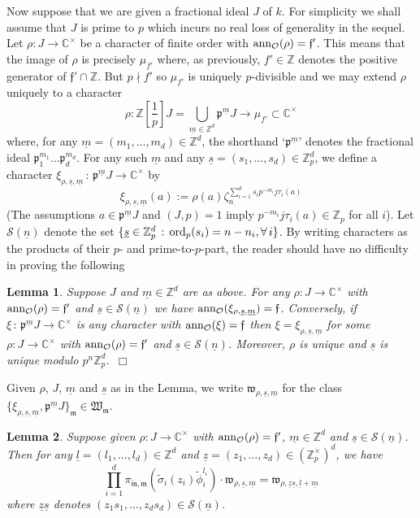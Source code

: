 \documentclass[12pt]{article}
\newtheorem{lemma}{Lemma}[section]
\newcounter{rem}[section]%
\newcommand{\bbC}{\ensuremath{\mathbb{C}}}
\newcommand{\bbZ}{\ensuremath{\mathbb{Z}}}
\newcommand{\beql}[1]{\begin{equation}\label{#1}}
\newcommand{\cO}{\ensuremath{\mathcal{O}}}
\newcommand{\cS}{\ensuremath{\mathcal{S}}}
\newcommand{\eeq}{\end{equation}}
\newcommand{\ePf}{\hspace*{\fill}~$\Box$\vertsp\par}%
\newcommand{\ff}{\ensuremath{\mathfrak{f}}}
\newcommand{\fm}{\ensuremath{\mathfrak{m}}}
\newcommand{\fp}{\ensuremath{\mathfrak{p}}}
\newcommand{\fw}{\ensuremath{\mathfrak{w}}}
\newcommand{\fW}{\ensuremath{\mathfrak{W}}}
\newcommand{\ndiv}{\nmid}
\newcommand{\ord}{{\rm ord}}
\newcommand{\rem}{\refstepcounter{rem}\noindent{\sc Remark \therem}}%
\renewcommand{\therem}{\thesection.\arabic{rem}}
\newcommand{\vertsp}{\vspace{1ex}}
\newcommand{\tfm}{\ensuremath{{\tilde{\fm}}}}
\newcommand{\tphi}{\ensuremath{\tilde{\phi}}}
\newcommand{\tsigma}{\ensuremath{\tilde{\sigma}}}
\newcommand{\ul}{\ensuremath{{\underline{l}}}}
\newcommand{\um}{\ensuremath{{\underline{m}}}}
\newcommand{\un}{\ensuremath{{\underline{n}}}}
\newcommand{\us}{\ensuremath{{\underline{s}}}}
\newcommand{\uz}{\ensuremath{{\underline{z}}}}
\begin{document}
Now suppose that we are given a fractional ideal $J$ of $k$.
For simplicity we shall assume that $J$ is prime to $p$ which incurs no real loss
of generality in the sequel. Let $\rho:J\rightarrow\bbC^\times$
be a character of finite order
with ${\rm ann}_\cO(\rho)=\ff'$. This means that the image of $\rho$ is precisely
$\mu_{f'}$ where, as previously, $f'\in\bbZ$ denotes the
positive generator of $\ff'\cap \bbZ$. But $p\ndiv f'$ so
$\mu_{f'}$ is uniquely $p$-divisible and we may extend
$\rho$ uniquely to a character
\[
\rho:\bbZ[{\textstyle\frac{1}{p}}]J=
\bigcup_{\um\in\bbZ^d}\fp^\um J\longrightarrow\mu_{f'}\subset\bbC^\times
\]
where, for any $\um=(m_1,\ldots,m_d)\in\bbZ^d$,  the shorthand `$\fp^\um$' denotes
the fractional ideal $\fp_1^{m_1}\ldots\fp_d^{m_d}$. For any such $\um$ and
any $\us=(s_1,\ldots,s_d)\in\bbZ_p^d$, we define a character
$\xi_{\rho,\us,\um}\,:\,\fp^\um J\rightarrow \bbC^\times$
by
\beql{eq:3M.75}
\xi_{\rho,\us,\um}(a):=\rho(a)\zeta_n^{\sum_{i=1}^d s_ip^{-m_i}j\tau_i(a)}
\eeq
(The assumptions $a\in\fp^\um J$ and $(J,p)=1$ imply
$p^{-m_i}j\tau_i(a)\in\bbZ_p$ for all $i$).
Let $\cS(\un)$ denote the set
$\{\us\in\bbZ_p^d\,:\,\ord_p(s_i)=n-n_i, \forall\,i\}$.
By writing characters as the products of their $p$- and prime-to-$p$-part,
the reader should have no difficulty in proving the following
\begin{lemma}\label{lemma:3F} Suppose $J$ and $\um\in\bbZ^d$ are as above.
For any $\rho: J\rightarrow\bbC^\times$ with ${\rm ann}_\cO(\rho)=\ff'$
and $\us\in\cS(\un)$ we have ${\rm ann}_\cO(\xi_{\rho,\us,\um})=\ff$.
Conversely, if $\xi\,:\,\fp^\um J\rightarrow\bbC^\times$ is any
character with ${\rm ann}_\cO(\xi)=\ff$ then $\xi=\xi_{\rho,\us,\um}$
for some $\rho: J\rightarrow\bbC^\times$ with ${\rm ann}_\cO(\rho)=\ff'$
and $\us\in\cS(\un)$.
Moreover, $\rho$ is unique and $\us$ is unique modulo $p^n\bbZ_p^d$.\ePf
\end{lemma}
Given $\rho$, $J$, $\um$ and $\us$ as in the Lemma, we write $\fw_{\rho,\us,\um}$
for the class $\{\xi_{\rho,\us,\um},\fp^\um J\}_\fm\in\fW_\fm$.
\begin{lemma}\label{lemma:3G}  Suppose given
$\rho: J\rightarrow\bbC^\times$ with ${\rm ann}_\cO(\rho)=\ff'$,
$\um\in\bbZ^d$ and $\us\in\cS(\un)$. Then for any $\ul=(l_1,\ldots,l_d)\in\bbZ^d$
and $\uz=(z_1,\ldots,z_d)\in(\bbZ_p^\times)^d$, we have
\[
\prod_{i=1}^d\pi_{\tfm,\fm}(\tsigma_i(z_i)\tphi_i^{l_i})\cdot\fw_{\rho,\us,\um}=
\fw_{\rho,\uz\us,\ul+\um}
\]
where $\uz\us$ denotes $(z_1s_1,\ldots,z_ds_d)\in\cS(\un)$.
\end{lemma}
\end{document}
